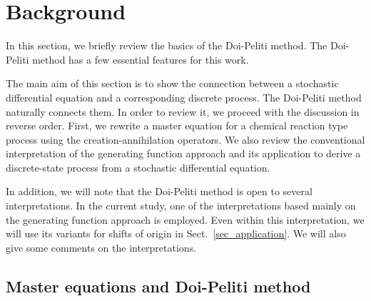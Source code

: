 \documentclass[sn-mathphys,Numbered]{sn-jnl}%
\theoremstyle{thmstyleone}%
\theoremstyle{thmstyletwo}%
\theoremstyle{thmstylethree}%
\begin{document}
\section{Background}

In this section, we briefly review the basics of the Doi-Peliti method.
The Doi-Peliti method has a few essential features for this work.

The main aim of this section is to show the connection between a stochastic differential equation and a corresponding discrete process. The Doi-Peliti method naturally connects them. In order to review it, we proceed with the discussion in reverse order. First, we rewrite a master equation for a chemical reaction type process using the creation-annihilation operators. We also review the conventional interpretation of the generating function approach and its application to derive a discrete-state process from a stochastic differential equation.

In addition, we will note that the Doi-Peliti method is open to several interpretations. In the current study, one of the interpretations based mainly on the generating function approach is employed. Even within this interpretation, we will use its variants for shifts of origin in Sect.~\ref{sec_application}. We will also give some comments on the interpretations.


\subsection{Master equations and Doi-Peliti method}
\label{sec_Doi_Peliti}
\end{document}

